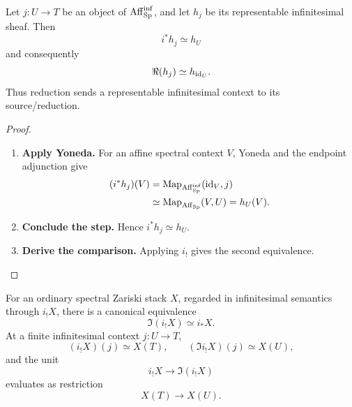 \begin{proposition}
\label{prop:reduction-representable-infinitesimal-context}
Let \(j:U\to T\) be an object of \(\operatorname{Aff}_{\operatorname{Sp}}^{\inf}\), and let \(h_j\) be
its representable infinitesimal sheaf. Then
\[
    i^*h_j\simeq h_U
\]
and consequently
\[
    \Re(h_j)\simeq h_{\operatorname{id}_U}.
\]
Thus reduction sends a representable infinitesimal context to its
source/reduction.
\end{proposition}

\begin{proof}
\leavevmode
\begin{enumerate}[label=\textup{(\arabic*)}]
    \item \textbf{Apply Yoneda.}
    For an affine spectral context \(V\), Yoneda and the endpoint adjunction give
    \[
    \begin{aligned}
        (i^*h_j)(V)
        &=\operatorname{Map}_{\operatorname{Aff}_{\operatorname{Sp}}^{\inf}}(\operatorname{id}_V,j)
        \\
        &\simeq\operatorname{Map}_{\operatorname{Aff}_{\operatorname{Sp}}}(V,U)
        =h_U(V).
    \end{aligned}
    \]

    \item \textbf{Conclude the step.}
    Hence \(i^*h_j\simeq h_U\).

    \item \textbf{Derive the comparison.}
    Applying \(i_!\) gives the second equivalence.
\end{enumerate}
\end{proof}

\begin{proposition}
\label{prop:infinitesimal-shape-forgets-variation}
For an ordinary spectral Zariski stack \(X\), regarded in infinitesimal
semantics through \(i_!X\), there is a canonical equivalence
\[
    \Im(i_!X)\simeq i_*X.
\]
At a finite infinitesimal context \(j:U\to T\),
\[
    (i_!X)(j)\simeq X(T),
    \qquad
    (\Im i_!X)(j)\simeq X(U),
\]
and the unit
\[
    i_!X\longrightarrow\Im(i_!X)
\]
evaluates as restriction
\[
    X(T)\longrightarrow X(U).
\]
\end{proposition}

